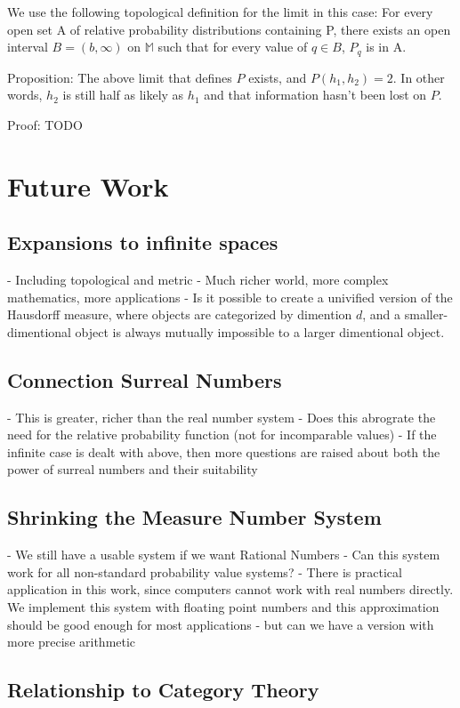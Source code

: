 \documentclass[twoside]{article}
\theoremstyle{plain}%
\theoremstyle{definition}
\theoremstyle{remark}
\begin{document}
We use the following topological definition for the limit in this case: For every open set A of relative probability distributions containing P, there exists an open interval \(B=(b, \infty)\) on \(\mathbb{M}\) such that for every value of \(q \in B\), \(P_q\) is in A.

Proposition: The above limit that defines \(P\) exists, and \(P(h_1, h_2) = 2\). In other words, \(h_2\) is still half as likely as \(h_1\) and that information hasn't been lost on \(P\).

Proof: TODO

\section{Future Work}
\subsection{Expansions to infinite spaces}
- Including topological and metric
- Much richer world, more complex mathematics, more applications
- Is it possible to create a univified version of the Hausdorff measure, where objects are categorized by dimention \(d\), and a smaller-dimentional object is always mutually impossible to a larger dimentional object.
\subsection{Connection Surreal Numbers}
- This is greater, richer than the real number system
- Does this abrograte the need for the relative probability function (not for incomparable values)
- If the infinite case is dealt with above, then more questions are raised about both the power of surreal numbers and their suitability
\subsection{Shrinking the Measure Number System}
- We still have a usable system if we want Rational Numbers
- Can this system work for all non-standard probability value systems?
- There is practical application in this work, since computers cannot work with real numbers directly. We implement this system with floating point numbers and this approximation should be good enough for most applications - but can we have a version with more precise arithmetic
\subsection{Relationship to Category Theory}
\end{document}
